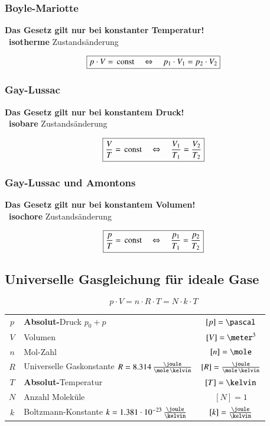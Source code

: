 	
\subsubsection{Boyle-Mariotte}	

\textbf{Das Gesetz gilt nur bei konstanter Temperatur!} \\
\textrightarrow\ \textbf{isotherme} Zustandsänderung

$$  \boxed{ p \cdot V = \, \mathop{} \! \mathrm{const} \quad \Leftrightarrow \quad p_1 \cdot V_1 = p_2 \cdot V_2 } $$ 


\subsubsection{Gay-Lussac}

\textbf{ Das Gesetz gilt nur bei konstantem Druck!} \\
\textrightarrow\ \textbf{isobare} Zustandsänderung

$$  \boxed{ \frac{V}{T} = \, \mathop{} \! \mathrm{const} \quad \Leftrightarrow \quad \frac{V_1}{T_1} = \frac{V_2}{T_2} } $$

	
\subsubsection{Gay-Lussac und Amontons}

\textbf{Das Gesetz gilt nur bei konstantem Volumen!} \\
\textrightarrow\  \textbf{isochore} Zustandsänderung

$$ \boxed{ \frac{p}{T} = \, \mathop{} \! \mathrm{const} \quad \Leftrightarrow \quad \frac{p_1}{T_1} = \frac{p_2}{T_2} } $$
	
	
\subsection{Universelle Gasgleichung für ideale Gase}

\vspace{-0.2cm}

$$ \boxed{ p \cdot V = n \cdot R \cdot T = N \cdot k \cdot T }$$
	
\renewcommand{\arraystretch}{1.3}
\begin{tabular}{c l c}
	$p$	& \textbf{Absolut-}Druck $p_0 + p$ 											& $[p] = \pascal$							\\
	$V$	& Volumen 																	& $[V] = \meter^3$ 							\\
	$n$	& Mol-Zahl 																	& $[n] = \mole$	 							\\
	$R$	& Universelle Gaskonstante $R = 8.314 \, \frac{\joule}{\mole \, \kelvin}$ 	& $[R] = \frac{\joule}{\mole \, \kelvin}$ 	\\
	$T$	& \textbf{Absolut-}Temperatur 												& $[T] = \kelvin$ 							\\
	$N$	& Anzahl Moleküle 															& $[N] = 1$ 								\\
	$k$	& Boltzmann-Konstante $k = 1.381 \cdot 10^{-23} \, \frac{\joule}{\kelvin}$ 	& $[k] = \frac{\joule}{\kelvin}$
\end{tabular}
\renewcommand{\arraystretch}{1}
	
